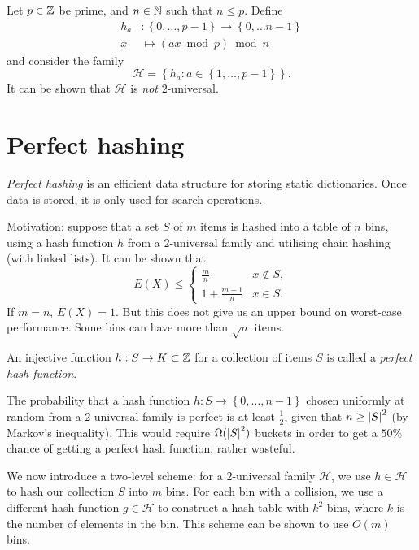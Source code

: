 \documentclass[a4paper]{article}
\begin{document}
\begin{example}
	Let $p \in \mathbb{Z}$ be prime, and $n \in \mathbb{N}$ such that $n \leq p$.
	Define
	\begin{align*}
		h_a &: \left\{ 0, \ldots, p-1 \right\} \to \left\{ 0, \ldots n-1 \right\} \\
		x &\mapsto \left( ax \bmod p \right) \bmod n
	\end{align*}
	and consider the family
	\[
		\mathcal H = \left\{ h_a : a \in \left\{ 1, \ldots, p-1 \right\} \right\}.
	\]
	It can be shown that $\mathcal H$ is \emph{not} $2$-universal.
\end{example}

\section{Perfect hashing}

\emph{Perfect hashing} is an efficient data structure for storing
static dictionaries.
Once data is stored, it is only used for search operations.

Motivation: suppose that a set $S$ of $m$ items is hashed
into a table of $n$ bins, using a hash function $h$ from a
$2$-universal family and utilising chain hashing (with linked lists).
It can be shown that
\[
	E\left( X \right) \leq \begin{cases}
		\frac mn & x \not\in S, \\
		1 + \frac{m-1}{n} & x \in S.
	\end{cases}
\]
If $m = n$, $E(X) = 1$.
But this does not give us an upper bound on worst-case performance.
Some bins can have more than $\sqrt n$ items.

An injective function $h: S \to K \subset \mathbb{Z}$ for a collection of items
$S$ is called a \emph{perfect hash function}.

The probability that a hash function 
$h: S \to \left\{ 0, \ldots, n-1 \right\}$ chosen uniformly at random from
a $2$-universal family is perfect is at least $\frac12$, 
given that $n \geq \left\lvert S \right\rvert^2$ (by Markov's inequality).
This would require $\Omega(\left\lvert S \right\rvert^2)$ buckets in order to get a
$50\%$ chance of getting a perfect hash function, rather wasteful.

We now introduce a two-level scheme: for a $2$-universal family $\mathcal H$,
we use $h \in \mathcal H$ to hash our collection $S$
into $m$ bins. 
For each bin with a collision, we use a different hash function
$g \in \mathcal H$ to construct a hash table with $k^2$ bins,
where $k$ is the number of elements in the bin.
This scheme can be shown to use $O(m)$ bins.
\end{document}
